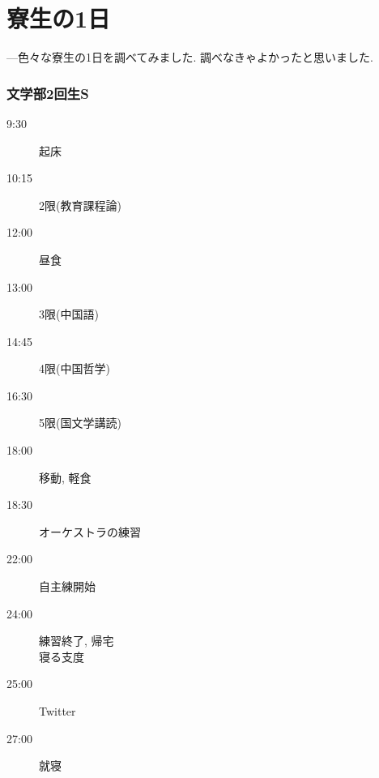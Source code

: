 \documentclass[10pt,b5jsbook,dvips,dvipdfmx,openany]{jsbook}
\theoremstyle{definition}
\begin{document}
	\section{寮生の1日}
	---色々な寮生の1日を調べてみました. 調べなきゃよかったと思いました.
	\begin{multicols}{3}







			
			\subsubsection{文学部2回生S}
			
			\begin{description}
			\item[ 9:30] 起床
			\item[10:15] 2限(教育課程論)
			\item[12:00] 昼食
			\item[13:00] 3限(中国語)
			\item[14:45] 4限(中国哲学)
			\item[16:30] 5限(国文学講読)
			\item[18:00] 移動, 軽食
			\item[18:30] オーケストラの練習
			\item[22:00] 自主練開始
			\item[24:00] 練習終了, 帰宅 \\ 寝る支度
			\item[25:00] Twitter
			\item[27:00] 就寝


\end{description}
\end{multicols}
\end{document}

